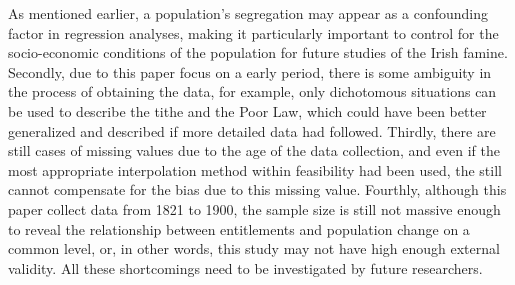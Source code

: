 As mentioned earlier, a population's segregation may appear as a confounding factor in regression analyses, making it particularly important to control for the socio-economic conditions of the population for future studies of the Irish famine. Secondly, due to this paper focus on a early period, there is some ambiguity in the process of obtaining the data, for example, only dichotomous situations can be used to describe the tithe and the Poor Law, which could have been better generalized and described if more detailed data had followed. Thirdly, there are still cases of missing values due to the age of the data collection, and even if the most appropriate interpolation method within feasibility had been used, the still cannot compensate for the bias due to this missing value. Fourthly, although this paper collect data from 1821 to 1900, the sample size is still not massive enough to reveal the relationship between entitlements and population change on a common level, or, in other words, this study may not have high enough external validity. All these shortcomings need to be investigated by future researchers.


